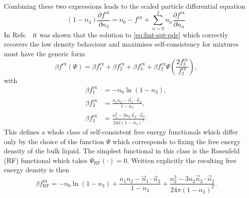 Combining these two expressions leads to the scaled particle%
differential equation \cite{RosenfeldPRL1989}
\begin{equation}\label{eq:fmt-spt-pde}
  (1 - n_3) \frac{\partial f^\mathrm{ex}}{\partial n_3}
  =
  n_0 - f^\mathrm{ex}
  + \sum_{\alpha = 0}^2
  n_\alpha \frac{\partial f^\mathrm{ex}}{\partial n_\alpha}
\end{equation}
In Refs.\ \cite{SantosJCP2012,SantosPRE2012} it was shown that the solution to \eqref{eq:fmt-spt-pde} which correctly recovers the low density behaviour and maximises self-consistency for mixtures must have the generic form
\begin{equation}\label{eq:santos-fmt}
  \beta f^\mathrm{ex}(\Psi)
  =
  \beta f^\mathrm{ex}_1 + \beta f^\mathrm{ex}_2 + \beta f^\mathrm{ex}_3
  + \beta f^\mathrm{ex}_2 \Psi\left(\frac{2 f^\mathrm{ex}_3}{f^\mathrm{ex}_2}\right),
\end{equation}
with
\begin{subequations}
  \begin{align}
    \beta f^\mathrm{ex}_1
    &=
    - n_0 \ln{(1 - n_3)},
    \\
    \beta f^\mathrm{ex}_2
    &=
    \frac{n_1 n_2 - \vec{n}_1 \cdot \vec{n}_2}{1 - n_3},
    \\
    \beta f^\mathrm{ex}_3
    &=
    \frac{n_2^3 - 3 n_2 \, \vec{n}_2 \cdot \vec{n}_2}{24 \pi (1 - n_3)^2}.
  \end{align}
\end{subequations}
This defines a whole class of self-consistent free energy functionals which differ only by the choice of the function $\Psi$ which corresponds to fixing the free energy density of the bulk liquid.
The simplest functional in this class is the Rosenfeld (RF) functional which takes $\Psi_\mathrm{RF}(\cdot) = 0$.
Written explicitly the resulting free energy density is then \cite{RosenfeldPRL1989}
\begin{equation}\label{eq:rosenfeld-functional}
  \beta f_\mathrm{RF}^\mathrm{ex}
  =
  - n_0 \ln{(1 - n_3)}
  + \frac{n_1 n_2 - \vec{n}_1 \cdot \vec{n}_2}{1 - n_3}
  + \frac{n_2^3 - 3 n_2 \vec{n}_2 \cdot \vec{n}_2}{24 \pi (1 - n_3)^2}.
\end{equation}

